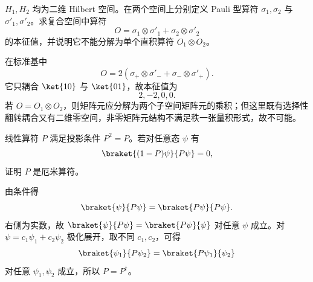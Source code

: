\begin{question}
$H_1,H_2$ 均为二维 Hilbert 空间。在两个空间上分别定义 Pauli 型算符 $\sigma_1,\sigma_2$ 与 $\sigma'_1,\sigma'_2$。求复合空间中算符
\[
  O=\sigma_1\otimes\sigma'_1+\sigma_2\otimes\sigma'_2
\]
的本征值，并说明它不能分解为单个直积算符 $O_1\otimes O_2$。
\begin{solution}
在标准基中
\[
  O=2(\sigma_+\otimes\sigma'_-+\sigma_-\otimes\sigma'_+).
\]
它只耦合 $\ket{10}$ 与 $\ket{01}$，故本征值为
\[
  2, -2, 0, 0.
\]
若 $O=O_1\otimes O_2$，则矩阵元应分解为两个子空间矩阵元的乘积；但这里既有选择性翻转耦合又有二维零空间，非零矩阵元结构不满足秩一张量积形式，故不可能。
\end{solution}
\end{question}

\begin{question}
线性算符 $P$ 满足投影条件 $P^2=P$。若对任意态 $\psi$ 有
\[
  \braket{(1-P)\psi}{P\psi}=0,
\]
证明 $P$ 是厄米算符。
\begin{solution}
由条件得
\[
  \braket{\psi}{P\psi}=\braket{P\psi}{P\psi}.
\]
右侧为实数，故 $\braket{\psi}{P\psi}=\braket{P\psi}{\psi}$ 对任意 $\psi$ 成立。对 $\psi=c_1\psi_1+c_2\psi_2$ 极化展开，取不同 $c_1,c_2$，可得
\[
  \braket{\psi_1}{P\psi_2}=\braket{P\psi_1}{\psi_2}
\]
对任意 $\psi_1,\psi_2$ 成立，所以 $P=P^\dagger$。
\end{solution}
\end{question}
